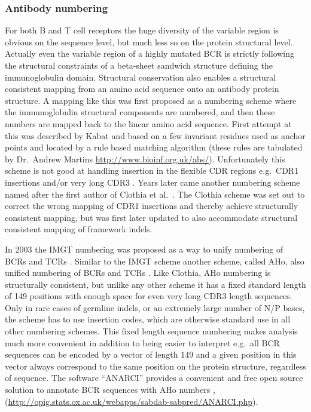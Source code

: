 \subsubsection{Antibody numbering}
For both B and T cell receptors the huge diversity of the variable region is obvious on the sequence level, but much less so on the protein structural level.
Actually even the variable region of a highly mutated BCR is strictly following the structural constraints of a beta-sheet sandwich structure defining the immunoglobulin domain.
Structural conservation also enables a structural consistent mapping from an amino acid sequence onto an antibody protein structure.
A mapping like this was first proposed as a numbering scheme where the immunoglobulin structural components are numbered, and then these numbers are mapped back to the linear amino acid sequence.
First attempt at this was described by Kabat \cite{national1983sequences} and based on a few invariant residues used as anchor points and located by a rule based matching algorithm (these rules are tabulated by Dr.\ Andrew Martins \url{http://www.bioinf.org.uk/abs/}).
Unfortunately this scheme is not good at handling insertion in the flexible CDR regions e.g.\ CDR1 insertions and/or very long CDR3 \cite{martin2010protein}.
Years later came another numbering scheme named after the first author of Clothia et al.\ \cite{chothia1987canonical}.
The Clothia scheme was set out to correct the wrong mapping of CDR1 insertions and thereby achieve structurally consistent mapping, but was first later updated to also accommodate structural consistent mapping of framework indels.

In 2003 the IMGT numbering was proposed as a way to unify numbering of BCRs and TCRs \cite{lefranc2003imgt}.
Similar to the IMGT scheme another scheme, called AHo, also unified numbering of BCRs and TCRs \cite{honegger2001yet}.
Like Clothia, AHo numbering is structurally consistent, but unlike any other scheme it has a fixed standard length of 149 positions with enough space for even very long CDR3 length sequences.
Only in rare cases of germline indels, or an extremely large number of N/P bases, the scheme has to use insertion codes, which are otherwise standard use in all other numbering schemes.
This fixed length sequence numbering makes analysis much more convenient in addition to being easier to interpret e.g.\ all BCR sequences can be encoded by a vector of length 149 and a given position in this vector always correspond to the same position on the protein structure, regardless of sequence.
The software ``ANARCI'' provides a convenient and free open source solution to annotate BCR sequences with AHo numbers \cite{dunbar2016anarci}, (\url{http://opig.stats.ox.ac.uk/webapps/sabdab-sabpred/ANARCI.php}).

